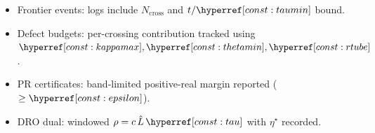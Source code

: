 \begin{acceptbox}
\begin{itemize}[leftmargin=*]
  \item Frontier events: logs include $N_\mathrm{cross}$ and $t/\constref{taumin}$ bound.
  \item Defect budgets: per-crossing contribution tracked using $\constref{kappamax},\constref{thetamin},\constref{rtube}$.
  \item PR certificates: band-limited positive-real margin reported ($\ge\constref{epsilon}$).
  \item DRO dual: windowed $\rho=c\,\hat L\,\constref{tau}$ with $\eta^\star$ recorded.
\end{itemize}
\end{acceptbox}
